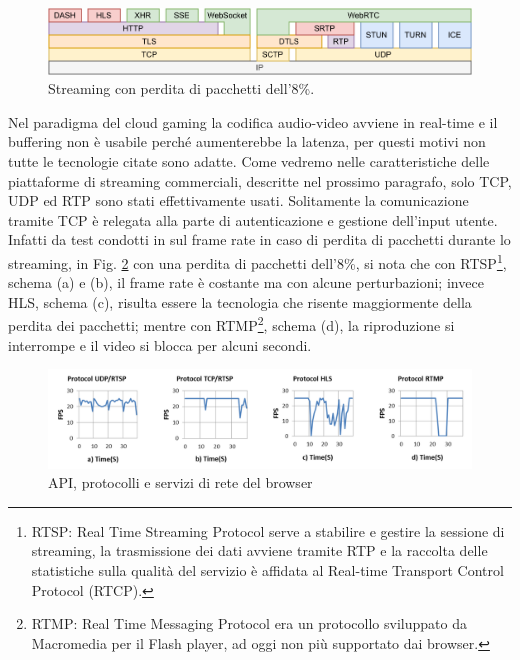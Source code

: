 \begin{figure}[H]
	\includegraphics[width=\linewidth]{immagini/webprotocols}
	\caption{Streaming con perdita di pacchetti dell'8\%.}
	\label{fig:webprotocols}
\end{figure}

Nel paradigma del cloud gaming la codifica audio-video avviene in real-time e il buffering non è usabile perché aumenterebbe la latenza, per questi motivi non tutte le tecnologie citate sono adatte. Come vedremo nelle caratteristiche delle piattaforme di streaming commerciali, descritte nel prossimo paragrafo, solo TCP, UDP ed RTP sono stati effettivamente usati. Solitamente la comunicazione tramite TCP è relegata alla parte di autenticazione e gestione dell'input utente. Infatti da test condotti in \parencite{Network_technology_for_transmission_of_visual_information} sul frame rate in caso di perdita di pacchetti durante lo streaming, in Fig. \ref{fig:fps_in_protocols} con una perdita di pacchetti dell'8\%, si nota che con RTSP\footnote{RTSP: Real Time Streaming Protocol serve a stabilire e gestire la sessione di streaming, la trasmissione dei dati avviene tramite RTP e la raccolta delle statistiche sulla qualità del servizio è affidata al Real-time Transport Control Protocol (RTCP).}, schema (a) e (b), il frame rate è costante ma con alcune perturbazioni; invece HLS, schema (c), risulta essere la tecnologia che risente maggiormente della perdita dei pacchetti; mentre con RTMP\footnote{RTMP: Real Time Messaging Protocol era un protocollo sviluppato da Macromedia per il Flash player, ad oggi non più supportato dai browser.}, schema (d), la riproduzione si interrompe e il video si blocca per alcuni secondi.

\begin{figure}[H]
	\includegraphics[width=\linewidth]{immagini/fps_in_protocols}
	\caption{API, protocolli e servizi di rete del browser}
	\label{fig:fps_in_protocols}
\end{figure}

